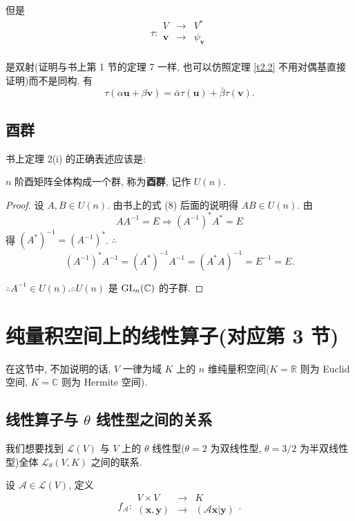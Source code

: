 \documentclass{ctexart}
\begin{document}
但是
\[\tau:\begin{array}{rcl}
    V & \to & V^* \\
    \boldsymbol{v} & \to & \psi_{\boldsymbol{v}} \\
\end{array}\]

是双射(证明与书上第 1 节的定理 7 一样, 也可以仿照定理 \ref{t2.2} 不用对偶基直接证明)而不是同构. 有
\[\tau(\alpha\boldsymbol{u}+\beta\boldsymbol{v})=\bar{\alpha}\tau(\boldsymbol{u})+\bar{\beta}\tau(\boldsymbol{v}).\]
\subsection{酉群}
书上定理 2(i) 的正确表述应该是:
\begin{theorem}
    $n$ 阶酉矩阵全体构成一个群, 称为\textbf{酉群}, 记作 $U(n)$.
\end{theorem}
\begin{proof}
    设 $A,B\in U(n)$. 由书上的式 (8) 后面的说明得 $AB\in U(n)$. 由
    \[AA^{-1}=E\Rightarrow(A^{-1})^*A^*=E\]
    得 $(A^*)^{-1}=(A^{-1})^*$. $\therefore$
    \[(A^{-1})^*A^{-1}=(A^*)^{-1}A^{-1}=(A^*A)^{-1}=E^{-1}=E.\]

    $\therefore A^{-1}\in U(n).\therefore U(n)$ 是 $\operatorname{GL} _n(\mathbb{C})$ 的子群.
\end{proof}
\section{纯量积空间上的线性算子(对应第 3 节)}
在这节中, 不加说明的话, $V$ 一律为域 $K$ 上的 $n$ 维纯量积空间($K=\mathbb{R}$ 则为 Euclid 空间, $K=\mathbb{C}$ 则为 Hermite 空间).
\subsection{线性算子与 $\theta$ 线性型之间的关系}
我们想要找到 $\mathcal{L}(V)$ 与 $V$ 上的 $\theta$ 线性型($\theta=2$ 为双线性型, $\theta=3/2$ 为半双线性型)全体 $\mathcal{L}_\theta(V,K)$ 之间的联系.

设 $\mathcal{A}\in\mathcal{L}(V)$, 定义
\[f_{\mathcal{A}}:\begin{array}{rcl}
    V\times V & \to & K \\
    (\boldsymbol{x},\boldsymbol{y}) & \to & (\mathcal{A}\boldsymbol{x}|\boldsymbol{y}) \\
\end{array}.\]
\end{document}
